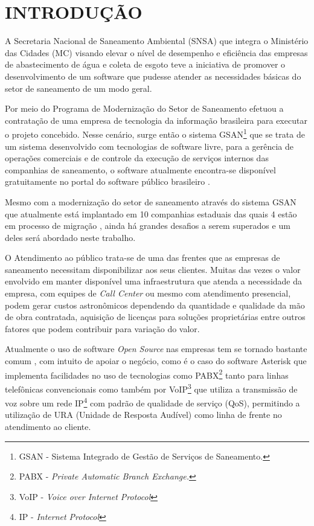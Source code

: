 \chapter[Introdução]{\textbf{\uppercase{Introdução}}}

A Secretaria Nacional de Saneamento Ambiental (SNSA) que integra o Ministério das Cidades (MC) visando elevar o nível de desempenho e eficiência das empresas de abastecimento de água e coleta de esgoto teve a iniciativa de promover o desenvolvimento de um software que pudesse atender as necessidades básicas do setor de saneamento de um modo geral.

Por meio do Programa de Modernização do Setor de Saneamento \cite{PMSS:2014} efetuou a contratação de uma empresa de tecnologia da informação brasileira para executar o projeto concebido.  Nesse cenário, surge então o sistema GSAN\footnote{GSAN - Sistema Integrado de Gestão de Serviços de Saneamento.} que se trata de um sistema desenvolvido com tecnologias de software livre, para a gerência de operações comerciais e de controle da execução de serviços internos das companhias de saneamento, o software atualmente encontra-se disponível gratuitamente no portal do software público brasileiro \cite{PORTAL:2014}. 

Mesmo com a modernização do setor de saneamento através do sistema GSAN que atualmente está implantado em 10 companhias estaduais das quais 4 estão em processo de migração \cite{PMSS:2014}, ainda há grandes desafios a serem superados e um deles será abordado neste trabalho.

O Atendimento ao público trata-se de uma das frentes que as empresas de saneamento necessitam disponibilizar aos seus clientes. Muitas das vezes o valor envolvido em manter disponível uma infraestrutura que atenda a necessidade da empresa, com equipes de \textit{Call Center} ou mesmo com atendimento presencial, podem gerar custos astronômicos dependendo da quantidade e qualidade da mão de obra contratada, aquisição de licenças para soluções proprietárias entre outros fatores que podem contribuir para variação do valor. 

Atualmente o uso de software \textit{Open Source} nas empresas tem se tornado bastante comum \cite{MEIRELLES2014}, com intuito de apoiar o negócio, como é o caso do software Asterisk que implementa facilidades no uso de tecnologias como PABX\footnote{PABX - \textit{Private Automatic Branch Exchange.}}  tanto para linhas telefônicas convencionais como também por VoIP\footnote{VoIP - \textit{Voice over Internet Protocol}} que utiliza a transmissão de voz sobre um rede IP\footnote{IP - \textit{Internet Protocol}} com padrão de qualidade de serviço (QoS), permitindo a utilização de URA (Unidade de Resposta Audível) \cite{VIEIRA:2007} como linha de frente no atendimento ao cliente.


